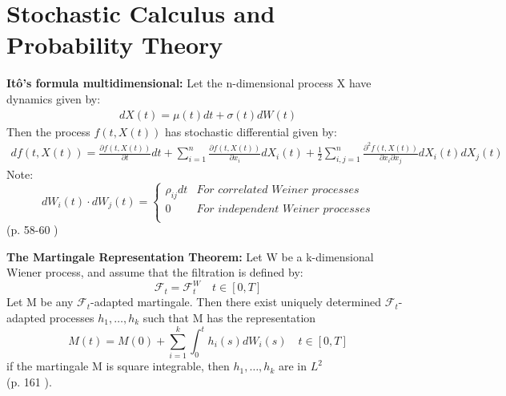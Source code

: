
\chapter{Stochastic Calculus and Probability Theory} %

\label{AppendixA} %

\begin{theorem}\label{Ito}
\textbf{Itô's formula multidimensional: } Let the n-dimensional process X have dynamics given by:
\begin{align}
dX(t)=\mu(t)dt+\sigma(t)dW(t)
\end{align}
Then the process $f(t,X(t))$ has stochastic differential given by:
\begin{equation}
\begin{split}
df(t,X(t))=\frac{\partial f(t,X(t))}{\partial t}  dt + \sum_{i=1}^{n} \frac{\partial f(t,X(t))}{\partial x_i}  dX_i(t) + \frac{1}{2} \sum_{i,j=1}^{n} \frac{\partial^2 f(t,X(t))}{\partial x_i \partial x_j}  dX_i(t)dX_j(t)  
\end{split}
\end{equation}
Note: \[ dW_i(t) \cdot dW_j(t)= \begin{cases} 
      \rho_{ij}dt & \textit{For correlated Weiner processes} \\
      0 & \textit{For independent Weiner processes} \\
   \end{cases}
\]
\null \hfill (p. 58-60 \parencite{finKont})
\end{theorem}

\begin{theorem}\label{MRT}
\textbf{The Martingale Representation Theorem: } 
Let W be a k-dimensional Wiener process, and assume that the filtration is defined by:
$$\mathcal{F}_t=\mathcal{F}_t^W \quad t\in [0,T]$$
Let M be any $\mathcal{F}_t$-adapted martingale. Then there exist uniquely determined $\mathcal{F}_t$-adapted processes $h_1, \ldots, h_k$ such that M has the representation
$$M(t)=M(0) + \sum_{i=1}^{k} \int_{0}^{t} h_i(s)dW_i(s) \quad t \in [0,T]$$
if the martingale M is square integrable, then $h_1, \ldots, h_k$ are in $L^2$\\
\null \hfill (p. 161 \parencite{finKont}).
\end{theorem}

